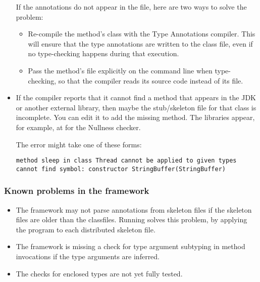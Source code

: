\begin{itemize}
If the annotations do not appear in the  file, here are two
ways to solve the problem:
\begin{itemize}
\item
  Re-compile the method's class with the Type Annotations compiler.  This will
  ensure that the type annotations are written to the class file, even if
  no type-checking happens during that execution.
\item
  Pass the method's file explicitly on the command line when type-checking,
  so that the compiler reads its source code instead of its 
  file.
\end{itemize}

\item
If the compiler reports that it cannot find a method that appears in the
JDK or another external library, then maybe the stub/skeleton file for that
class is incomplete.  You can edit it to add the missing method.  The
libraries appear, for example, at  for the
Nullness checker.

The error might take one of these forms:

\begin{Verbatim}
method sleep in class Thread cannot be applied to given types
cannot find symbol: constructor StringBuffer(StringBuffer)
\end{Verbatim}


\end{itemize}


\subsubsection{Known problems in the framework\label{known-problems}}

\begin{itemize}

\item
  The framework may not parse annotations from skeleton files if the
  skeleton files are older than the classfiles.  Running  solves this problem, by applying the 
   program to each distributed skeleton file.

\item The framework is missing a check for type argument subtyping in
  method invocations if the type arguments are inferred.

\item The checks for enclosed types are not yet fully tested.

\end{itemize}


